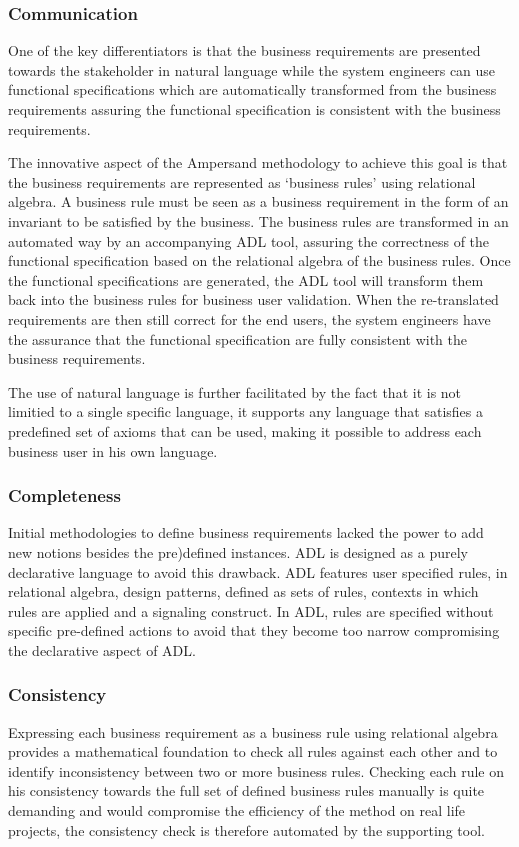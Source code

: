 \subsubsection{Communication}

One of the key differentiators is that the business requirements are presented towards the stakeholder in natural language while the system engineers can use functional specifications which are automatically transformed from the business requirements assuring the functional specification is consistent with the business requirements.

The innovative aspect of the Ampersand methodology to achieve this goal is that the business requirements are  represented as `business rules' using relational algebra. A business rule must be seen as a business requirement in the form of an invariant to be satisfied by the business. The business rules are transformed in an automated way by an accompanying ADL tool, assuring the correctness of the functional specification based on the relational algebra of the business rules. Once the functional specifications are generated, the ADL tool will transform them back into the business rules for business user validation. When the re-translated requirements are then still correct for the end users, the system engineers have the assurance that the functional specification are fully consistent with the business requirements. 

The use of natural language is further facilitated by the fact that it is not limitied to a single specific language, it supports any language that satisfies a predefined set of axioms that can be used, making it possible to address each business user in his own language.

\subsubsection{Completeness}
Initial methodologies to define business requirements lacked the power to add new notions besides the pre)defined instances. ADL is designed as a purely declarative language to avoid this drawback. ADL features user specified rules, in relational algebra, design patterns, defined as sets of rules, contexts in which rules are applied and a signaling construct. In ADL, rules are specified without specific pre-defined actions to avoid that they become too narrow compromising the declarative aspect of ADL.

\subsubsection{Consistency}
Expressing each business requirement as a business rule using relational algebra provides a mathematical foundation to check all rules against each other and to identify inconsistency between two or more business rules.  Checking each rule on his consistency towards the full set of defined business rules manually is quite demanding and would compromise the efficiency of the method on real life projects, the consistency check is therefore automated by the supporting tool.

